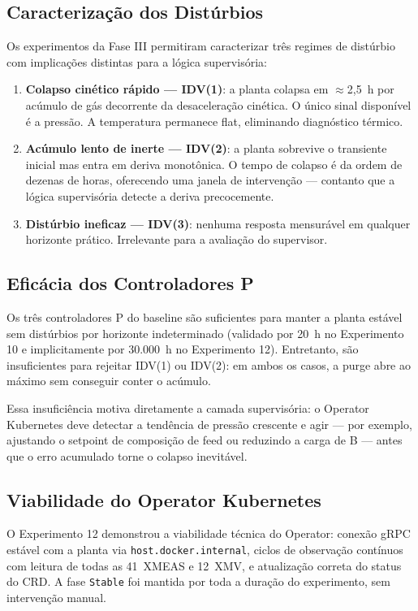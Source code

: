 \subsection{Caracterização dos Distúrbios}

Os experimentos da Fase III permitiram caracterizar três regimes de distúrbio com implicações distintas para a lógica supervisória:

\begin{enumerate}
  \item \textbf{Colapso cinético rápido — IDV(1)}: a planta colapsa em $\approx$2,5~h por acúmulo de gás decorrente da desaceleração cinética. O único sinal disponível é a pressão. A temperatura permanece flat, eliminando diagnóstico térmico.
  \item \textbf{Acúmulo lento de inerte — IDV(2)}: a planta sobrevive o transiente inicial mas entra em deriva monotônica. O tempo de colapso é da ordem de dezenas de horas, oferecendo uma janela de intervenção — contanto que a lógica supervisória detecte a deriva precocemente.
  \item \textbf{Distúrbio ineficaz — IDV(3)}: nenhuma resposta mensurável em qualquer horizonte prático. Irrelevante para a avaliação do supervisor.
\end{enumerate}

\subsection{Eficácia dos Controladores P}

Os três controladores P do baseline são suficientes para manter a planta estável sem distúrbios por horizonte indeterminado (validado por 20~h no Experimento 10 e implicitamente por 30.000~h no Experimento 12). Entretanto, são insuficientes para rejeitar IDV(1) ou IDV(2): em ambos os casos, a purge abre ao máximo sem conseguir conter o acúmulo.

Essa insuficiência motiva diretamente a camada supervisória: o Operator Kubernetes deve detectar a tendência de pressão crescente e agir — por exemplo, ajustando o setpoint de composição de feed ou reduzindo a carga de B — antes que o erro acumulado torne o colapso inevitável.

\subsection{Viabilidade do Operator Kubernetes}

O Experimento 12 demonstrou a viabilidade técnica do Operator: conexão gRPC estável com a planta via \texttt{host.docker.internal}, ciclos de observação contínuos com leitura de todas as 41~XMEAS e 12~XMV, e atualização correta do status do CRD. A fase \texttt{Stable} foi mantida por toda a duração do experimento, sem intervenção manual.

